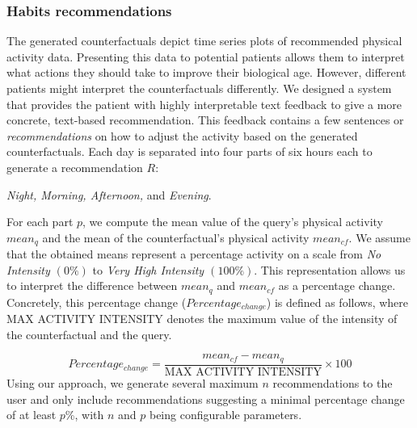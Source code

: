 \subsubsection{Habits recommendations}
The generated counterfactuals depict time series plots of recommended physical activity data. Presenting this data to potential patients allows them to interpret what actions they should take to improve their biological age. However, different patients might interpret the counterfactuals differently. 
We designed a system that provides the patient with highly interpretable text feedback to give a more concrete, text-based recommendation. This feedback contains a few sentences or \textit{recommendations} on how to adjust the activity based on the generated counterfactuals. Each day is separated into four parts of six hours each to generate a recommendation $R$:
\begin{center}
    \textit{Night, Morning, Afternoon,} and \textit{Evening}.
\end{center}
For each part $p$, we compute the mean value of the query's physical activity $mean_q$ and the mean of the counterfactual's physical activity $mean_{cf}$. We assume that the obtained means represent a percentage activity on a scale from \textit{No Intensity $(0\%)$} to \textit{Very High Intensity $(100\%)$}. This representation allows us to interpret the difference between $mean_q$ and $mean_{cf}$ as a 
 percentage change. Concretely, this percentage change ($Percentage_{change}$) is defined as follows, where MAX ACTIVITY INTENSITY denotes the maximum value of the intensity of the counterfactual and the query.

\begin{equation}
    Percentage_{change} = \frac{mean_{cf} - mean_{q}}{\text{MAX ACTIVITY INTENSITY}} \times 100
\end{equation}
Using our approach, we generate several maximum $n$ recommendations to the user and only include recommendations suggesting a minimal percentage change of at least $p$\%, with $n$ and $p$ being configurable parameters.
\newpage

